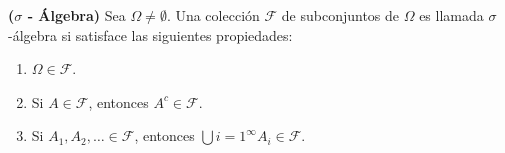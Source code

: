 \begin{definition}{\bf ($\sigma$ - \'Algebra)}
    Sea $\Omega\neq\emptyset$. Una colecci\'on $\mathcal{F}$ de subconjuntos de $\Omega$ es llamada $\sigma$-\'algebra si satisface las siguientes propiedades:
    \begin{enumerate}
        \item $\Omega\in\mathcal{F}$.
        \item Si $A\in\mathcal{F}$, entonces $A^{c}\in\mathcal{F}$.
        \item Si $A_{1},A_{2},\ldots\in\mathcal{F}$, entonces $\bigcup{i=1}^{\infty}A_{i}\in\mathcal{F}$.
    \end{enumerate}
\end{definition}


